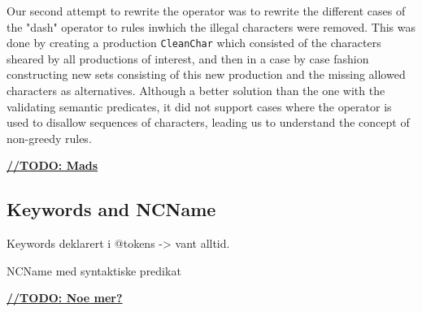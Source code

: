 Our second attempt to rewrite the operator was to rewrite the different cases of the "dash" operator to rules inwhich the illegal characters were removed. This was done by creating a production \verb!CleanChar! which consisted of the characters sheared by all productions of interest, and then in a case by case fashion constructing new sets consisting of this new production and the missing allowed characters as alternatives. Although a better solution than the one with the validating semantic predicates, it did not support cases where the operator is used to disallow sequences of characters, leading us to understand the concept of non-greedy rules.

\underline{\textbf{\LARGE //TODO: Mads}}
\subsection{Keywords and NCName}
Keywords deklarert i @tokens -> vant alltid.

NCName med syntaktiske predikat

\underline{\textbf{\LARGE //TODO: Noe mer?}}